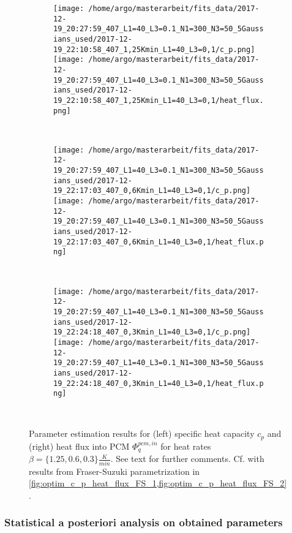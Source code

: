 \documentclass{scrartcl}[12pt, halfparskip]
\numberwithin{equation}{section}
\numberwithin{figure}{section}
\numberwithin{table}{section}
\begin{document}
\begin{figure}[H]
	\begin{subfigure}{1.\textwidth}
		\texttt{[image: /home/argo/masterarbeit/fits\_data/2017-12-19\_20:27:59\_407\_L1=40\_L3=0.1\_N1=300\_N3=50\_5Gaussians\_used/2017-12-19\_22:10:58\_407\_1,25Kmin\_L1=40\_L3=0,1/c\_p.png]}
		\texttt{[image: /home/argo/masterarbeit/fits\_data/2017-12-19\_20:27:59\_407\_L1=40\_L3=0.1\_N1=300\_N3=50\_5Gaussians\_used/2017-12-19\_22:10:58\_407\_1,25Kmin\_L1=40\_L3=0,1/heat\_flux.png]}
	\end{subfigure} \\[1ex]
	
	
	\begin{subfigure}{1.\textwidth}
		\texttt{[image: /home/argo/masterarbeit/fits\_data/2017-12-19\_20:27:59\_407\_L1=40\_L3=0.1\_N1=300\_N3=50\_5Gaussians\_used/2017-12-19\_22:17:03\_407\_0,6Kmin\_L1=40\_L3=0,1/c\_p.png]}
		\texttt{[image: /home/argo/masterarbeit/fits\_data/2017-12-19\_20:27:59\_407\_L1=40\_L3=0.1\_N1=300\_N3=50\_5Gaussians\_used/2017-12-19\_22:17:03\_407\_0,6Kmin\_L1=40\_L3=0,1/heat\_flux.png]}
	\end{subfigure} \\[1ex]
	
	
	\begin{subfigure}{1.\textwidth}
		\texttt{[image: /home/argo/masterarbeit/fits\_data/2017-12-19\_20:27:59\_407\_L1=40\_L3=0.1\_N1=300\_N3=50\_5Gaussians\_used/2017-12-19\_22:24:18\_407\_0,3Kmin\_L1=40\_L3=0,1/c\_p.png]}
		\texttt{[image: /home/argo/masterarbeit/fits\_data/2017-12-19\_20:27:59\_407\_L1=40\_L3=0.1\_N1=300\_N3=50\_5Gaussians\_used/2017-12-19\_22:24:18\_407\_0,3Kmin\_L1=40\_L3=0,1/heat\_flux.png]}
	\end{subfigure} \\[1ex]
	
	

	\caption{Parameter estimation results for (left) specific heat capacity $c_p$ and (right) heat flux into PCM $\varPhi_q^{pcm,in}$ for heat rates $\beta=\{ 1.25, 0.6, 0.3 \} \frac{K}{min}$. See text for further comments. Cf. with results from Fraser-Suzuki parametrization in \cref{fig:optim_c_p_heat_flux_FS_1,fig:optim_c_p_heat_flux_FS_2}.}
	\label{fig:optim_c_p_heat_flux_5Gaussians_2}
\end{figure}

\subsubsection{Statistical a posteriori analysis on obtained parameters}
\end{document}
